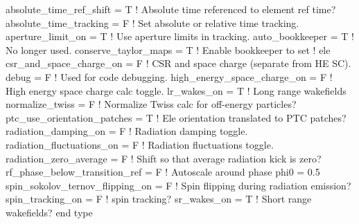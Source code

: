 {\begin{example}
    absolute_time_ref_shift = T         ! Absolute time referenced to element ref time?
    absolute_time_tracking = F          ! Set absolute or relative time tracking.
    aperture_limit_on = T               ! Use aperture limits in tracking.
    auto_bookkeeper = T                 ! No longer used.
    conserve_taylor_maps = T            ! Enable bookkeeper to set
                                        ! ele%
    csr_and_space_charge_on = F         ! CSR and space charge (separate from HE SC).
    debug = F                           ! Used for code debugging.
    high_energy_space_charge_on = F     ! High energy space charge calc toggle.
    lr_wakes_on = T                     ! Long range wakefields
    normalize_twiss = F                 ! Normalize Twiss calc for off-energy particles?
    ptc_use_orientation_patches = T     ! Ele orientation translated to PTC patches?
    radiation_damping_on = F            ! Radiation damping toggle.
    radiation_fluctuations_on = F       ! Radiation fluctuations toggle.
    radiation_zero_average = F          ! Shift so that average radiation kick is zero?
    rf_phase_below_transition_ref = F   ! Autoscale around phase phi0 = 0.5
    spin_sokolov_ternov_flipping_on = F ! Spin flipping during radiation emission?
    spin_tracking_on = F                ! spin tracking?
    sr_wakes_on = T                     ! Short range wakefields?
  end type
\end{example}

}
